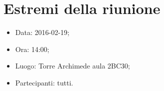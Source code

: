 \documentclass[../RiunioneInterna16-02-19.tex]{subfiles}
\begin{document}
\section{Estremi della riunione}
	\begin{itemize}
		\item Data: 2016-02-19;
		\item Ora: 14:00;
		\item Luogo: Torre Archimede aula 2BC30;
		\item Partecipanti: tutti.
	\end{itemize}
\end{document}
